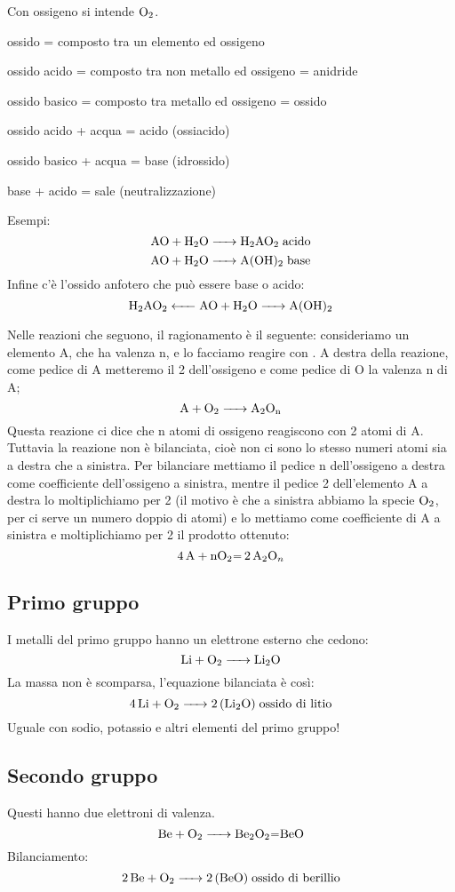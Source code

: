 Con ossigeno si intende \(\ce{ O2 }\).

ossido = composto tra un elemento ed ossigeno

ossido acido = composto tra non metallo ed ossigeno = anidride

ossido basico = composto tra metallo ed ossigeno = ossido

ossido acido + acqua = acido (ossiacido)

ossido basico + acqua = base (idrossido)

base + acido = sale (neutralizzazione)

Esempi:
$$\ce{ AO + H2O -> H2AO2 } \; \text{acido}$$ 
$$\ce{ AO + H2O -> A(OH)_2 } \;  \text{base}$$
Infine c'è l'ossido anfotero che può essere base o acido:
$$\ce{ H_2AO_2 <- AO + H_2O -> A(OH)_2 }$$%

Nelle reazioni che seguono, il ragionamento è il seguente: consideriamo un elemento A, che ha valenza n, e lo facciamo reagire con . A destra della reazione, come pedice di A metteremo il 2 dell'ossigeno e come pedice di O la valenza n di A;
$$\ce{A + O_2 -> A_2O_{\text{n}}}$$
Questa reazione ci dice che n atomi di ossigeno reagiscono con 2 atomi di A. Tuttavia la reazione non è bilanciata, cioè non ci sono lo stesso numeri atomi sia a destra che a sinistra. Per bilanciare mettiamo il pedice n dell'ossigeno a destra come coefficiente dell'ossigeno a sinistra, mentre il pedice 2 dell'elemento A a destra lo moltiplichiamo per 2 (il motivo è che a sinistra abbiamo la specie $\rm O_2$, per ci serve un numero doppio di atomi) e lo mettiamo come coefficiente di A a sinistra e moltiplichiamo per 2 il prodotto ottenuto:
$$\ce{4A + nO_2= 2A_2O_n}$$

\subsection{Primo gruppo}
I metalli del primo gruppo hanno un elettrone esterno che cedono:
$$\ce{ Li + O_2 -> Li_2O }$$
La massa non è scomparsa, l'equazione bilanciata è così:
$$\ce{ 4 Li + O_2 -> 2 (Li_2O) } \; \text{ossido di litio}$$
Uguale con sodio, potassio e altri elementi del primo gruppo!
\subsection{Secondo gruppo}
Questi hanno due elettroni di valenza.
$$\ce{ Be + O_2 -> Be_2O_2=BeO }$$
Bilanciamento:
$$\ce{ 2 Be + O_2 -> 2 (BeO) } \; \text{ossido di berillio}$$
